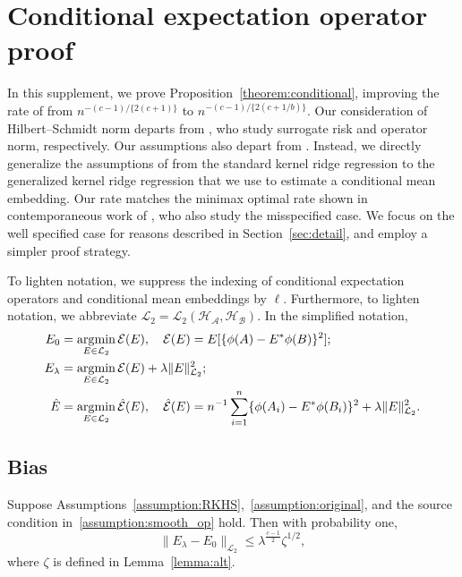 \section{Conditional expectation operator proof}\label{sec:operator}

In this supplement, we prove Proposition~\ref{theorem:conditional}, improving the rate of \cite{singh2019kernel} from $n^{-(c-1)/\{2(c+1)\}}$ to $n^{-(c-1)/\{2(c+1/b)\}}$. Our consideration of Hilbert--Schmidt norm departs from \cite{park2020measure,talwai2022sobolev}, who study surrogate risk and operator norm, respectively. Our assumptions also depart from \cite{singh2019kernel,park2020measure,talwai2022sobolev}. Instead, we directly generalize the assumptions of \cite{fischer2017sobolev} from the standard kernel ridge regression to the generalized kernel ridge regression that we use to estimate a conditional mean embedding. Our rate matches the minimax optimal rate shown in contemporaneous work of  \cite{li2022optimal}, who also study the misspecified case. We focus on the well specified case for reasons described in Section~\ref{sec:detail}, and employ a simpler proof strategy.

To lighten notation, we suppress the indexing of conditional expectation operators and conditional mean embeddings by $\ell$. Furthermore, to lighten notation, we abbreviate $\mathcal{L}_2=\mathcal{L}_2(\mathcal{H}_{\mathcal{A}},\mathcal{H}_{\mathcal{B}})$. In the simplified notation,
\begin{align*}
    E_0&=\operatorname*{\arg\!\min}_{E\in\mathcal{L}_2}\mathcal{E}(E),\quad \mathcal{E}(E)=E[\{\phi(A)-E^*\phi(B)\}^2]; \\
    E_{\lambda}&=\operatorname*{\arg\!\min}_{E\in\mathcal{L}_2}\mathcal{E}(E)+\lambda\|E\|^2_{\mathcal{L}_2};\\
    \hat{E}&=\operatorname*{\arg\!\min}_{E\in\mathcal{L}_2}\hat{\mathcal{E}}(E),\quad \hat{\mathcal{E}}(E)=n^{-1}\sum_{i=1}^n\{\phi(A_{i})-E^*\phi(B_{i})\}^2+\lambda\|E\|^2_{\mathcal{L}_2}.
\end{align*}

\subsection{Bias}

\begin{proposition}\label{prop:bias}
Suppose Assumptions~\ref{assumption:RKHS},~\ref{assumption:original}, and the source condition in~\ref{assumption:smooth_op} hold. Then with probability one,
$$
\|E_{\lambda}-E_{0}\|_{\mathcal{L}_2} \leq \lambda^{\frac{c-1}{2}}\zeta^{1/2},
$$
where $\zeta$ is defined in Lemma~\ref{lemma:alt}.
\end{proposition}

